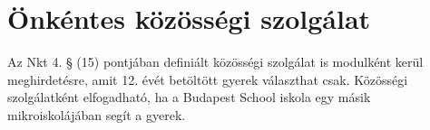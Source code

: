 \section{Önkéntes közösségi szolgálat}

Az Nkt 4. § (15) pontjában definiált közösségi szolgálat is modulként
kerül meghirdetésre, amit 12. évét betöltött gyerek választhat csak.
Közösségi szolgálatként elfogadható, ha a Budapest School iskola egy
másik mikroiskolájában segít a gyerek.

